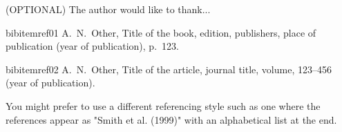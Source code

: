 \documentclass[12pt, onecolumn]{revtex4}    %
\begin{document}
\begin{acknowledgments}

(OPTIONAL) The author would like to thank...

\end{acknowledgments}

\begin{thebibliography}{}

bibitem{ref01} A.~N.~Other, Title of the book, edition, publishers, place of publication (year of publication), p.~123.   %

bibitem{ref02} A.~N.~Other, Title of the article, journal title, volume, 123--456 (year of publication).   %

 You might prefer to use a different referencing style such as one where the references appear as "Smith et al. (1999)" with an alphabetical list at the end.

\end{thebibliography} 
\end{document}
